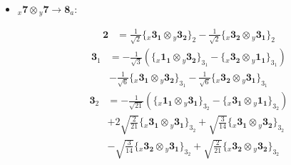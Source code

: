 \documentclass[english]{article}
\newcommand{\rep}[1]{\mathbf{#1}}
\newcommand{\repx}[2]{{}_{#2}\mathbf{#1}}
\newcommand{\tsprodx}[2]{\repx{#1}{x}\otimes\repx{#2}{y}}
\newcommand{\subcgs}[3]{\big\{ \tsprodx{#1}{#2}\big\}^{}_{#3}}
\begin{document}
\begin{itemize}
\begin{fleqn}
\begin{align*}
\end{align*}
\end{fleqn}
\item $\tsprodx{7}{7}\to\rep{8}_{a}$:
\begin{fleqn}
\begin{align*}
\rep{2} & = \frac{1}{\sqrt{2}}\subcgs{3_{1}}{3_{2}}{2}-\frac{1}{\sqrt{2}}\subcgs{3_{2}}{3_{1}}{2}
\end{align*}
\begin{align*}
\rep{3}_{1} & = -\frac{1}{\sqrt{3}}\left(\subcgs{1_{1}}{3_{2}}{3_{1}}-\subcgs{3_{2}}{1_{1}}{3_{1}}\right) \\ 
 & -\frac{1}{\sqrt{6}}\subcgs{3_{1}}{3_{2}}{3_{1}}-\frac{1}{\sqrt{6}}\subcgs{3_{2}}{3_{1}}{3_{1}}
\end{align*}
\begin{align*}
\rep{3}_{2} & = -\frac{1}{\sqrt{21}}\left(\subcgs{1_{1}}{3_{1}}{3_{2}}-\subcgs{3_{1}}{1_{1}}{3_{2}}\right) \\ 
 & +2 \sqrt{\frac{2}{21}}\subcgs{3_{1}}{3_{1}}{3_{2}}+\sqrt{\frac{3}{14}}\subcgs{3_{1}}{3_{2}}{3_{2}} \\ 
 & -\sqrt{\frac{3}{14}}\subcgs{3_{2}}{3_{1}}{3_{2}}+\sqrt{\frac{2}{21}}\subcgs{3_{2}}{3_{2}}{3_{2}}
\end{align*}
\end{fleqn}
\end{itemize}
\end{document}
